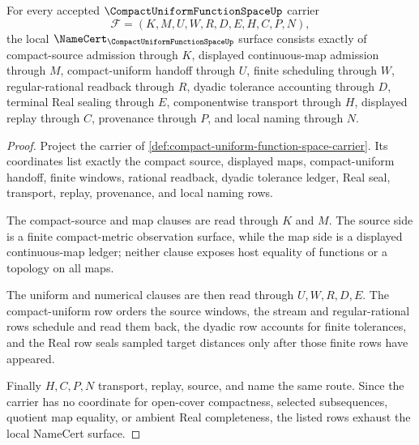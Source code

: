 \begin{theorem}
\label{thm:compact-uniform-function-space-namecert-obligations}
For every accepted $\CompactUniformFunctionSpaceUp$ carrier
$$
\mathcal{F}=(K,M,U,W,R,D,E,H,C,P,N),
$$
the local $\NameCert_{\CompactUniformFunctionSpaceUp}$ surface consists exactly of compact-source admission through $K$, displayed continuous-map admission through $M$, compact-uniform handoff through $U$, finite scheduling through $W$, regular-rational readback through $R$, dyadic tolerance accounting through $D$, terminal Real sealing through $E$, componentwise transport through $H$, displayed replay through $C$, provenance through $P$, and local naming through $N$.
\end{theorem}
\begin{proof}
Project the carrier of \autoref{def:compact-uniform-function-space-carrier}. Its coordinates list exactly the compact source, displayed maps, compact-uniform handoff, finite windows, rational readback, dyadic tolerance ledger, Real seal, transport, replay, provenance, and local naming rows.

The compact-source and map clauses are read through $K$ and $M$. The source side is a finite compact-metric observation surface, while the map side is a displayed continuous-map ledger; neither clause exposes host equality of functions or a topology on all maps.

The uniform and numerical clauses are then read through $U,W,R,D,E$. The compact-uniform row orders the source windows, the stream and regular-rational rows schedule and read them back, the dyadic row accounts for finite tolerances, and the Real row seals sampled target distances only after those finite rows have appeared.

Finally $H,C,P,N$ transport, replay, source, and name the same route. Since the carrier has no coordinate for open-cover compactness, selected subsequences, quotient map equality, or ambient Real completeness, the listed rows exhaust the local NameCert surface.
\end{proof}

